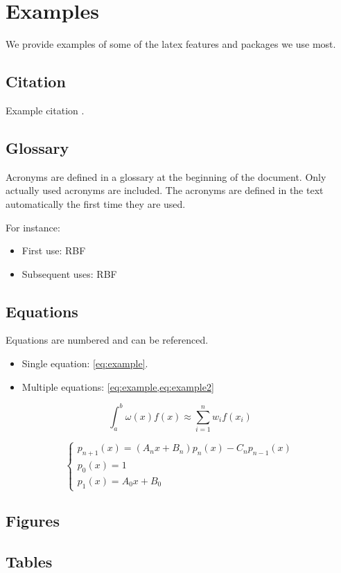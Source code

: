 \section{Examples}
We provide examples of some of the latex features and packages we use most.

\subsection{Citation}
Example citation \cite{Gehrels:2016}.


\subsection{Glossary}
Acronyms are defined in a glossary at the beginning of the document. Only
actually used acronyms are included. The acronyms are defined in the text
automatically the first time they are used.

For instance:
\begin{itemize}
\item First use: \gls{RBF}
\item Subsequent uses: \gls{RBF}
\end{itemize}

\subsection{Equations}
Equations are numbered and can be referenced.
\begin{itemize}
\item Single equation: \cref{eq:example}.
\item Multiple equations: \cref{eq:example,eq:example2}
\end{itemize}

\begin{equation} \label{eq:example}
\int_{a}^{b} \omega(x) f(x) \approx \sum_{i=1}^n w_i f(x_i)
\end{equation}

\begin{equation} \label{eq:example2}
\begin{cases}
p_{n+1}(x) = (A_n x + B_n) p_n(x) - C_n p_{n-1}(x) \\
p_0(x) = 1 \\
p_1(x) = A_0 x + B_0
\end{cases}
\end{equation}

\subsection{Figures}

\subsection{Tables}
